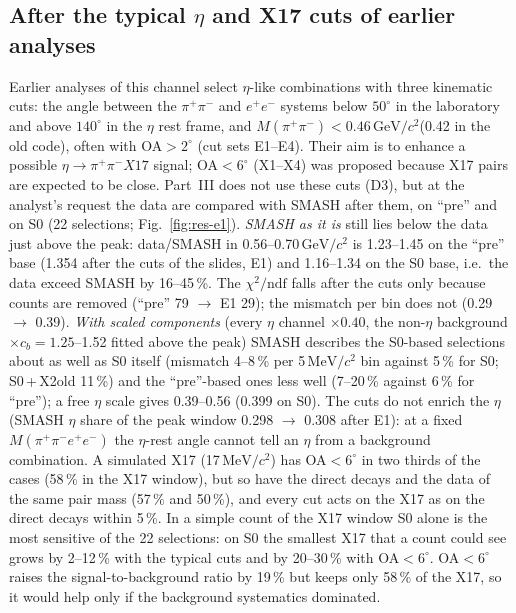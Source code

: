 \documentclass[11pt,a4paper]{article}
\newcommand{\ee}{\ensuremath{e^{+}e^{-}}\xspace}
\newcommand{\pipi}{\ensuremath{\pi^{+}\pi^{-}}\xspace}
\newcommand{\Mfour}{\ensuremath{M(\pi^{+}\pi^{-}e^{+}e^{-})}\xspace}
\newcommand{\Mpipi}{\ensuremath{M(\pi^{+}\pi^{-})}\xspace}
\newcommand{\GeVcc}{\ensuremath{\mathrm{GeV}/c^{2}}\xspace}
\newcommand{\MeVcc}{\ensuremath{\mathrm{MeV}/c^{2}}\xspace}
\newcommand{\cs}[1]{\textsf{#1}}%
\begin{document}
\subsection{After the typical \texorpdfstring{$\eta$}{eta} and X17 cuts of earlier analyses}
\label{sec:res-e1}
Earlier analyses of this channel select $\eta$-like combinations with three kinematic cuts: the angle between the \pipi and \ee systems below $50^\circ$
in the laboratory and above $140^\circ$ in the $\eta$ rest frame, and \Mpipi$<0.46$\,\GeVcc (0.42 in the old code), often with OA$>2^\circ$
(cut sets \cs{E1}--\cs{E4}). Their aim is to enhance a possible $\eta\to\pipi X17$ signal; OA$<6^\circ$ (\cs{X1}--\cs{X4}) was proposed because
X17 pairs are expected to be close. Part~III does not use these cuts (D3), but at the analyst's request the data are compared with SMASH after
them, on ``pre'' and on S0 (22 selections; Fig.~\ref{fig:res-e1}). \emph{SMASH as it is} still lies below the data just above the peak: data/SMASH
in 0.56--0.70\,\GeVcc is 1.23--1.45 on the ``pre'' base (1.354 after the cuts of the slides, \cs{E1}) and 1.16--1.34 on the S0 base, i.e.\ the data
exceed SMASH by 16--45\,\%. The $\chi^2/\mathrm{ndf}$ falls after the cuts only because counts are removed (``pre'' 79 $\to$ \cs{E1} 29); the mismatch per
bin does not (0.29 $\to$ 0.39). \emph{With scaled components} (every $\eta$ channel $\times0.40$, the non-$\eta$ background $\times c_b=1.25$--1.52
fitted above the peak) SMASH describes the S0-based selections about as well as S0 itself (mismatch 4--8\,\% per 5\,\MeVcc bin against 5\,\% for S0;
S0\,+\,\cs{X2old} 11\,\%) and the ``pre''-based ones less well (7--20\,\% against 6\,\% for ``pre''); a free $\eta$ scale gives 0.39--0.56 (0.399 on S0). The cuts do not enrich the $\eta$ (SMASH $\eta$ share of the peak window
0.298 $\to$ 0.308 after \cs{E1}): at a fixed \Mfour the $\eta$-rest angle cannot tell an $\eta$ from a background combination. A simulated X17 (17\,\MeVcc)
has OA$<6^\circ$ in two thirds of the cases (58\,\% in the X17 window), but so have the direct decays and the data of the same pair mass (57\,\%
and 50\,\%), and every cut acts on the X17 as on the direct decays within 5\,\%. In a simple count of the X17 window S0 alone is the most sensitive
of the 22 selections: on S0 the smallest X17 that a count could see grows by 2--12\,\% with the typical cuts and by 20--30\,\% with OA$<6^\circ$.
OA$<6^\circ$ raises the signal-to-background ratio by 19\,\% but keeps only 58\,\% of the X17, so it would help only if the background
systematics dominated.
\end{document}
